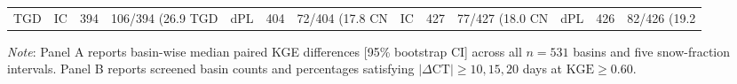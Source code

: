 \begin{table}[t]
\begin{threeparttable}
\begin{tabular}{lcccccc}
TGD & IC & 394 & 106/394 (26.9%
TGD & dPL & 404 & 72/404 (17.8%
CN & IC & 427 & 77/427 (18.0%
CN & dPL & 426 & 82/426 (19.2%
\bottomrule
\end{tabular}
\begin{tablenotes}[flushleft]
\small
\item \textit{Note}: Panel A reports basin-wise median paired KGE differences [95\% bootstrap CI] across all $n = 531$ basins and five snow-fraction intervals. Panel B reports screened basin counts and percentages satisfying $|\Delta\text{CT}| \ge 10, 15, 20$ days at $\text{KGE} \ge 0.60$.
\end{tablenotes}
\end{threeparttable}
\end{table}
